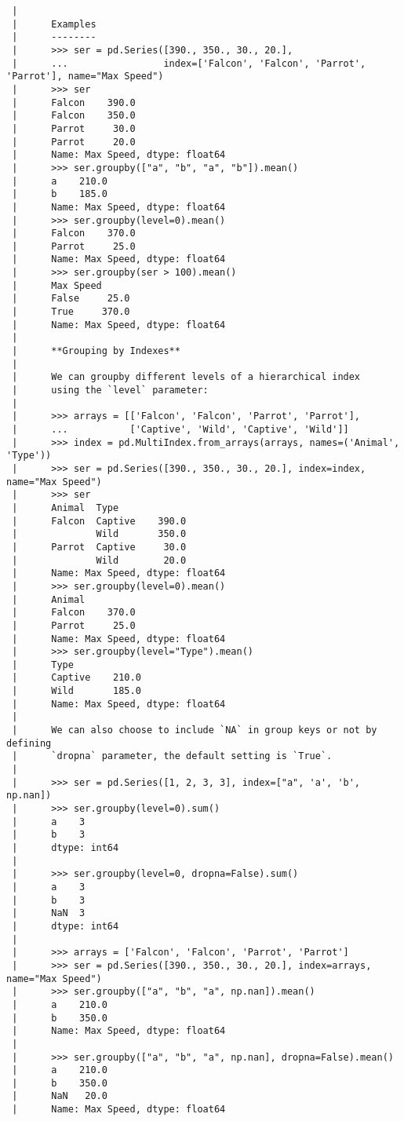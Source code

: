 \documentclass[
  letterpaper,
  DIV=11,
  numbers=noendperiod]{scrreprt}
\begin{document}
\begin{verbatim}
 |      
 |      Examples
 |      --------
 |      >>> ser = pd.Series([390., 350., 30., 20.],
 |      ...                 index=['Falcon', 'Falcon', 'Parrot', 'Parrot'], name="Max Speed")
 |      >>> ser
 |      Falcon    390.0
 |      Falcon    350.0
 |      Parrot     30.0
 |      Parrot     20.0
 |      Name: Max Speed, dtype: float64
 |      >>> ser.groupby(["a", "b", "a", "b"]).mean()
 |      a    210.0
 |      b    185.0
 |      Name: Max Speed, dtype: float64
 |      >>> ser.groupby(level=0).mean()
 |      Falcon    370.0
 |      Parrot     25.0
 |      Name: Max Speed, dtype: float64
 |      >>> ser.groupby(ser > 100).mean()
 |      Max Speed
 |      False     25.0
 |      True     370.0
 |      Name: Max Speed, dtype: float64
 |      
 |      **Grouping by Indexes**
 |      
 |      We can groupby different levels of a hierarchical index
 |      using the `level` parameter:
 |      
 |      >>> arrays = [['Falcon', 'Falcon', 'Parrot', 'Parrot'],
 |      ...           ['Captive', 'Wild', 'Captive', 'Wild']]
 |      >>> index = pd.MultiIndex.from_arrays(arrays, names=('Animal', 'Type'))
 |      >>> ser = pd.Series([390., 350., 30., 20.], index=index, name="Max Speed")
 |      >>> ser
 |      Animal  Type
 |      Falcon  Captive    390.0
 |              Wild       350.0
 |      Parrot  Captive     30.0
 |              Wild        20.0
 |      Name: Max Speed, dtype: float64
 |      >>> ser.groupby(level=0).mean()
 |      Animal
 |      Falcon    370.0
 |      Parrot     25.0
 |      Name: Max Speed, dtype: float64
 |      >>> ser.groupby(level="Type").mean()
 |      Type
 |      Captive    210.0
 |      Wild       185.0
 |      Name: Max Speed, dtype: float64
 |      
 |      We can also choose to include `NA` in group keys or not by defining
 |      `dropna` parameter, the default setting is `True`.
 |      
 |      >>> ser = pd.Series([1, 2, 3, 3], index=["a", 'a', 'b', np.nan])
 |      >>> ser.groupby(level=0).sum()
 |      a    3
 |      b    3
 |      dtype: int64
 |      
 |      >>> ser.groupby(level=0, dropna=False).sum()
 |      a    3
 |      b    3
 |      NaN  3
 |      dtype: int64
 |      
 |      >>> arrays = ['Falcon', 'Falcon', 'Parrot', 'Parrot']
 |      >>> ser = pd.Series([390., 350., 30., 20.], index=arrays, name="Max Speed")
 |      >>> ser.groupby(["a", "b", "a", np.nan]).mean()
 |      a    210.0
 |      b    350.0
 |      Name: Max Speed, dtype: float64
 |      
 |      >>> ser.groupby(["a", "b", "a", np.nan], dropna=False).mean()
 |      a    210.0
 |      b    350.0
 |      NaN   20.0
 |      Name: Max Speed, dtype: float64

\end{verbatim}
\end{document}
